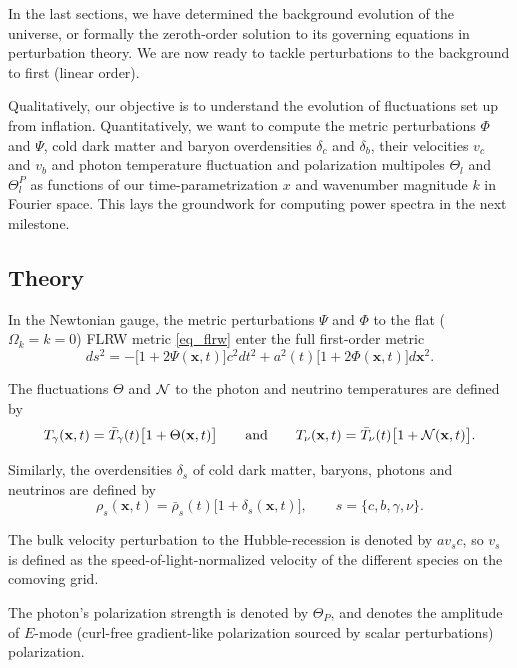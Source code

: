 \documentclass[10pt,a4paper]{article}
\begin{document}
In the last sections, we have determined the background evolution of the universe,
or formally the zeroth-order solution to its governing equations in perturbation theory.
We are now ready to tackle perturbations to the background to first (linear order).

Qualitatively, our objective is to understand the evolution of fluctuations set up from inflation.
Quantitatively, we want to compute the
metric perturbations $\Phi$ and $\Psi$,
cold dark matter and baryon overdensities $\delta_c$ and $\delta_b$,
their velocities $v_c$ and $v_b$
and photon temperature fluctuation and polarization multipoles $\Theta_l$ and $\Theta_l^P$
as functions of our time-parametrization $x$ and wavenumber magnitude $k$ in Fourier space.
This lays the groundwork for computing power spectra in the next milestone.

\subsection{Theory}

In the Newtonian gauge,
the metric perturbations $\Psi$ and $\Phi$ to the flat ($\Omega_k=k=0$) FLRW metric \eqref{eq_flrw}
enter the full first-order metric
\begin{equation}
	ds^2 = -\big[1 + 2\Psi(\mathbf{x},t)\big] c^2 dt^2 + a^2(t) \big[1 + 2\Phi(\mathbf{x},t)\big] d\mathbf{x}^2 .
\label{eq_metric}
\end{equation}

The fluctuations $\Theta$ and $\mathcal{N}$ to the photon and neutrino temperatures are defined by
\begin{equation}
	T_\gamma(\mathbf{x},t) = \bar{T}_\gamma(t) \big[1+\Theta(\mathbf{x},t)\big]
	\qquad \text{and} \qquad
	T_\nu(\mathbf{x},t) = \bar{T}_\nu(t) \big[1+\mathcal{N}(\mathbf{x},t)\big].
\end{equation}

Similarly, the overdensities $\delta_s$ of cold dark matter, baryons, photons and neutrinos are defined by
\begin{equation}
	\rho_s(\mathbf{x},t) = \bar{\rho}_s(t) \big[1+\delta_s(\mathbf{x},t)\big], \qquad s=\{c,b,\gamma,\nu\}.
\end{equation}

The bulk velocity perturbation to the Hubble-recession is denoted by $a v_s c$,
so $v_s$ is defined as the speed-of-light-normalized velocity of the different species on the comoving grid.

The photon's polarization strength is denoted by $\Theta_P$,
and denotes the amplitude of $E$-mode (curl-free gradient-like polarization sourced by scalar perturbations) polarization.
\end{document}
